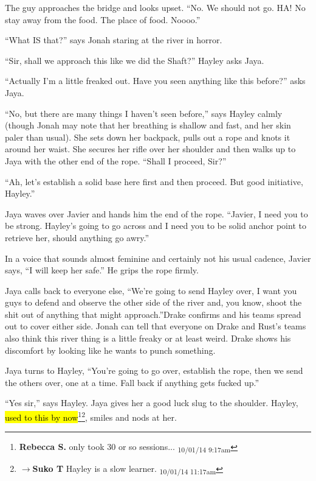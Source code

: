 The guy approaches the bridge and looks upset.  ``No.  We should not go.  HA!  No stay away from the food.  The place of food.  Noooo.''

``What IS that?'' says Jonah staring at the river in horror.

``Sir, shall we approach this like we did the Shaft?'' Hayley asks Jaya.

``Actually I'm a little freaked out.  Have you seen anything like this before?'' asks Jaya.

``No, but there are many things I haven't seen before,'' says Hayley calmly (though Jonah may note that her breathing is shallow and fast, and her skin paler than usual).  She sets down her backpack, pulls out a rope and knots it around her waist.  She secures her rifle over her shoulder and then walks up to Jaya with the other end of the rope.  ``Shall I proceed, Sir?''

``Ah, let's establish a solid base here first and then proceed. But good initiative, Hayley.''

Jaya waves over Javier and hands him the end of the rope.  ``Javier, I need you to be strong.  Hayley's going to go across and I need you to be solid anchor point to retrieve her, should anything go awry.''

In a voice that sounds almost feminine and certainly not his usual cadence, Javier says, ``I will keep her safe.'' He grips the rope firmly.



Jaya calls back to everyone else, ``We're going to send Hayley over, I want you guys to defend and observe the other side of the river and, you know, shoot the shit out of anything that might approach.''Drake confirms and his teams spread out to cover either side.  Jonah can tell that everyone on Drake and Rust's teams also think this river thing is a little freaky or at least weird.  Drake shows his discomfort by looking like he wants to punch something.



Jaya turns to Hayley, ``You're going to go over, establish the rope, then we send the others over, one at a time.  Fall back if anything gets fucked up.''

``Yes sir,'' says Hayley.  Jaya gives her a good luck slug to the shoulder.  Hayley, \hl{used to this by now}\footnote{\textbf{Rebecca S. }only took 30 or so sessions... \textsubscript{10/01/14 9:17am}}\footnote{$\rightarrow$\textbf{Suko T }Hayley is a slow learner. \textsubscript{10/01/14 11:17am}}, smiles and nods at her.

